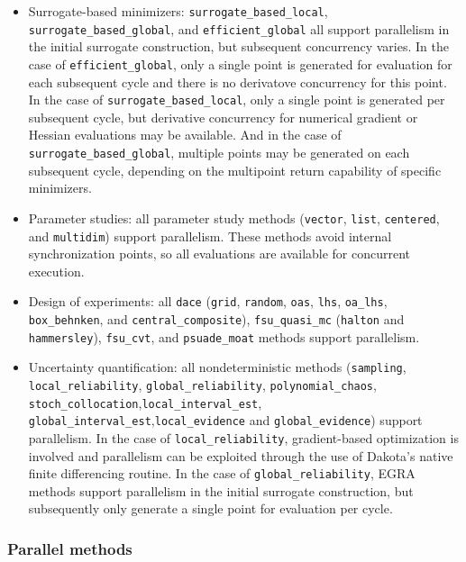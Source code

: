 \begin{itemize}
\item Surrogate-based minimizers: \texttt{surrogate\_based\_local},
  \texttt{surrogate\_based\_global}, and \texttt{efficient\_global}
  all support parallelism in the initial surrogate construction, but
  subsequent concurrency varies.  In the case of
  \texttt{efficient\_global}, only a single point is generated for
  evaluation for each subsequent cycle and there is no derivatove
  concurrency for this point.  In the case of
  \texttt{surrogate\_based\_local}, only a single point is generated
  per subsequent cycle, but derivative concurrency for numerical
  gradient or Hessian evaluations may be available.  And in the case
  of \texttt{surrogate\_based\_global}, multiple points may be
  generated on each subsequent cycle, depending on the multipoint
  return capability of specific minimizers.

\item Parameter studies: all parameter study methods (\texttt{vector},
  \texttt{list}, \texttt{centered}, and \texttt{multidim}) support
  parallelism. These methods avoid internal synchronization points, so
  all evaluations are available for concurrent execution.

\item Design of experiments: all \texttt{dace} (\texttt{grid},
  \texttt{random}, \texttt{oas}, \texttt{lhs}, \texttt{oa\_lhs},
  \texttt{box\_behnken}, and \texttt{central\_composite}),
  \texttt{fsu\_quasi\_mc} (\texttt{halton} and \texttt{hammersley}),
  \texttt{fsu\_cvt}, and \texttt{psuade\_moat} methods support
  parallelism.

\item Uncertainty quantification: all nondeterministic methods
  (\texttt{sampling}, \texttt{local\_reliability},
  \texttt{global\_reliability}, \texttt{polynomial\_chaos},
  \texttt{stoch\_collocation},\texttt{local\_interval\_est}, 
  \texttt{global\_interval\_est},\texttt{local\_evidence} and 
  \texttt{global\_evidence})
  support parallelism. In the case of
  \texttt{local\_reliability}, gradient-based optimization is
  involved and parallelism can be exploited through the use of
  Dakota's native finite differencing routine.  In the case of
  \texttt{global\_reliability}, EGRA methods support parallelism
  in the initial surrogate construction, but subsequently only
  generate a single point for evaluation per cycle.
\end{itemize}

\subsubsection{Parallel methods}\label{parallel:algorithms:strategies}

